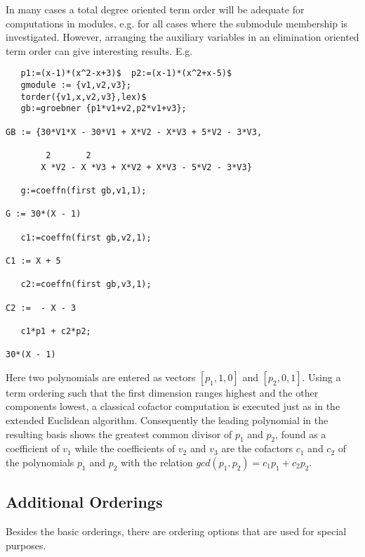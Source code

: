 In many cases a total degree oriented term order will be adequate
for computations in modules, e.g. for all cases where the
submodule membership is investigated. However, arranging
the auxiliary variables in an elimination oriented term order
can give interesting results. E.g.
\begin{verbatim}
   p1:=(x-1)*(x^2-x+3)$  p2:=(x-1)*(x^2+x-5)$
   gmodule := {v1,v2,v3};
   torder({v1,x,v2,v3},lex)$
   gb:=groebner {p1*v1+v2,p2*v1+v3};

GB := {30*V1*X - 30*V1 + X*V2 - X*V3 + 5*V2 - 3*V3,

        2       2
       X *V2 - X *V3 + X*V2 + X*V3 - 5*V2 - 3*V3}

   g:=coeffn(first gb,v1,1);

G := 30*(X - 1)

   c1:=coeffn(first gb,v2,1);

C1 := X + 5

   c2:=coeffn(first gb,v3,1);

C2 :=  - X - 3

   c1*p1 + c2*p2;

30*(X - 1)

\end{verbatim}
Here two polynomials
are entered as vectors $[p_1,1,0]$ and $[p_2,0,1]$. Using a term
ordering such that the first dimension ranges highest and the
other components lowest, a classical cofactor computation is
executed just as in the extended Euclidean algorithm.
Consequently the leading polynomial in the resulting
basis shows the greatest common divisor of $p_1$ and $p_2$,
found as a coefficient of $v_1$ while the coefficients
of $v_2$ and $v_3$ are the cofactors $c_1$ and $c_2$ of the polynomials
$p_1$ and $p_2$ with the relation $gcd(p_1,p_2) = c_1p_1 + c_2p_2$.


\subsection{Additional Orderings}
Besides the basic orderings, there are ordering options that are used for
special purposes.

